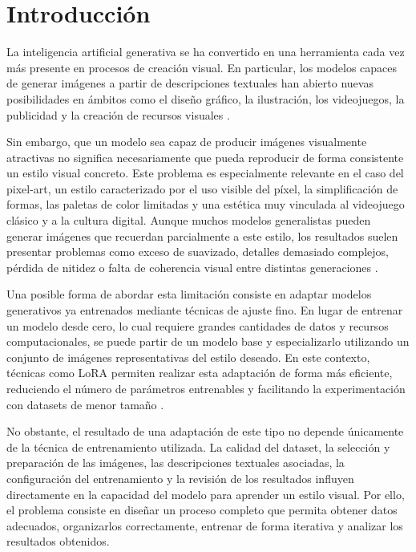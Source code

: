 \documentclass[a4paper,11pt,titlepage]{scrbook}
\begin{document}
\tableofcontents
\listoffigures
\listoftables

\mainmatter %



\chapter{Introducción}

La inteligencia artificial generativa se ha convertido en una herramienta cada vez más presente en procesos de creación visual. En particular, los modelos capaces de generar imágenes a partir de descripciones textuales han abierto nuevas posibilidades en ámbitos como el diseño gráfico, la ilustración, los videojuegos, la publicidad y la creación de recursos visuales \cite{amankwahamoah2024generativeai}.

\medskip

Sin embargo, que un modelo sea capaz de producir imágenes visualmente atractivas no significa necesariamente que pueda reproducir de forma consistente un estilo visual concreto. Este problema es especialmente relevante en el caso del pixel-art, un estilo caracterizado por el uso visible del píxel, la simplificación de formas, las paletas de color limitadas y una estética muy vinculada al videojuego clásico y a la cultura digital. Aunque muchos modelos generalistas pueden generar imágenes que recuerdan parcialmente a este estilo, los resultados suelen presentar problemas como exceso de suavizado, detalles demasiado complejos, pérdida de nitidez o falta de coherencia visual entre distintas generaciones \cite{hertz2024stylealigned}.

\medskip

Una posible forma de abordar esta limitación consiste en adaptar modelos generativos ya entrenados mediante técnicas de ajuste fino. En lugar de entrenar un modelo desde cero, lo cual requiere grandes cantidades de datos y recursos computacionales, se puede partir de un modelo base y especializarlo utilizando un conjunto de imágenes representativas del estilo deseado. En este contexto, técnicas como LoRA permiten realizar esta adaptación de forma más eficiente, reduciendo el número de parámetros entrenables y facilitando la experimentación con datasets de menor tamaño \cite{hu2022lora}.

\medskip

No obstante, el resultado de una adaptación de este tipo no depende únicamente de la técnica de entrenamiento utilizada. La calidad del dataset, la selección y preparación de las imágenes, las descripciones textuales asociadas, la configuración del entrenamiento y la revisión de los resultados influyen directamente en la capacidad del modelo para aprender un estilo visual. Por ello, el problema consiste en diseñar un proceso completo que permita obtener datos adecuados, organizarlos correctamente, entrenar de forma iterativa y analizar los resultados obtenidos.
\end{document}
